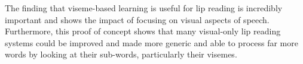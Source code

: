 The finding that \gls{viseme}-based learning is useful for lip reading is incredibly important and shows the impact of focusing on visual aspects of speech. Furthermore, this proof of concept shows that many visual-only lip reading systems could be improved and made more generic and able to process far more words by looking at their sub-words, particularly their \gls{viseme}s.\\